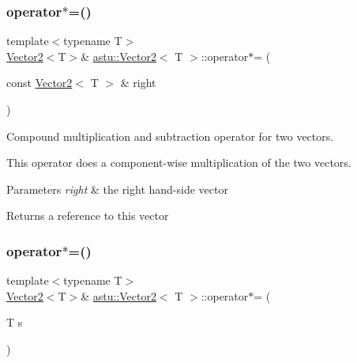 \subsubsection{\texorpdfstring{operator$\ast$=()}{operator*=()}\hspace{0.1cm}{\footnotesize\ttfamily [1/2]}}
{\footnotesize\ttfamily template$<$typename T$>$ \\
\hyperlink{classastu_1_1Vector2}{Vector2}$<$T$>$\& \hyperlink{classastu_1_1Vector2}{astu\+::\+Vector2}$<$ T $>$\+::operator$\ast$= (\begin{DoxyParamCaption}\item[{const \hyperlink{classastu_1_1Vector2}{Vector2}$<$ T $>$ \&}]{right }\end{DoxyParamCaption})\hspace{0.3cm}{\ttfamily [inline]}}

Compound multiplication and subtraction operator for two vectors.

This operator does a component-\/wise multiplication of the two vectors.


\begin{DoxyParams}{Parameters}
{\em right} & the right hand-\/side vector \\
\hline
\end{DoxyParams}
\begin{DoxyReturn}{Returns}
a reference to this vector 
\end{DoxyReturn}
\mbox{\label{classastu_1_1Vector2_a3a4e11dd85fbd0e1cda4e8b38b9aea6a}} 
\subsubsection{\texorpdfstring{operator$\ast$=()}{operator*=()}\hspace{0.1cm}{\footnotesize\ttfamily [2/2]}}
{\footnotesize\ttfamily template$<$typename T$>$ \\
\hyperlink{classastu_1_1Vector2}{Vector2}$<$T$>$\& \hyperlink{classastu_1_1Vector2}{astu\+::\+Vector2}$<$ T $>$\+::operator$\ast$= (\begin{DoxyParamCaption}\item[{T}]{s }\end{DoxyParamCaption})\hspace{0.3cm}{\ttfamily [inline]}}

